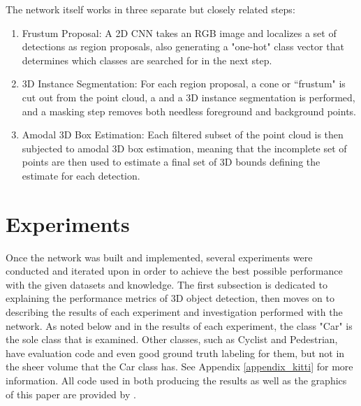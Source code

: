 The network itself works in three separate but closely related steps: 
\begin{enumerate}
    \item Frustum Proposal: A 2D CNN takes an RGB image and localizes a set of detections as region proposals, also generating a "one-hot" class vector that determines which classes are searched for in the next step.
    \item 3D Instance Segmentation: For each region proposal, a cone or ``frustum" is cut out from the point cloud, a and a 3D instance segmentation is performed, and a masking step removes both needless foreground and background points.
    \item Amodal 3D Box Estimation: Each filtered subset of the point cloud is then subjected to amodal 3D box estimation, meaning that the incomplete set of points are then used to estimate a final set of 3D bounds defining the estimate for each detection.
\end{enumerate}







\newpage
\section{Experiments}
\label{sect_experiments}
Once the network was built and implemented, several experiments were conducted and iterated upon in order to achieve the best possible performance with the given datasets and knowledge. The first subsection is dedicated to explaining the performance metrics of 3D object detection, then moves on to describing the results of each experiment and investigation performed with the network. As noted below and in the results of each experiment, the class "Car" is the sole class that is examined. Other classes, such as Cyclist and Pedestrian, have evaluation code and even good ground truth labeling for them, but not in the sheer volume that the Car class has. See Appendix \ref{appendix_kitti} for more information. All code used in both producing the results as well as the graphics of this paper are provided by \cite{gonzalez_smart3d_2019}. 

